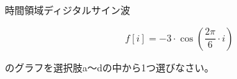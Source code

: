 時間領域ディジタルサイン波 

\[
f[i] = -3 \cdot \cos \left ( \frac{2\pi}{6} \cdot i  \right )
\]

\noindent のグラフを選択肢a〜dの中から1つ選びなさい。
